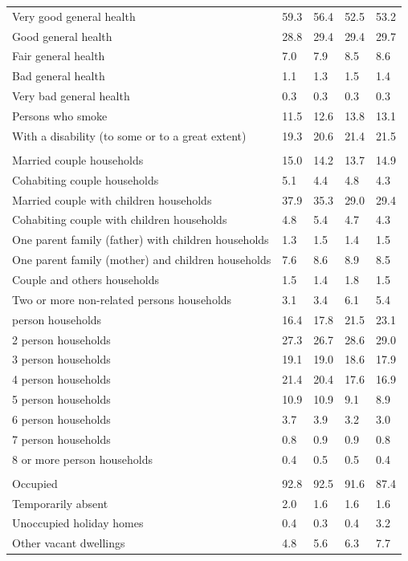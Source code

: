 \documentclass{article}
\begin{document}
\begin{table}[h]
\begin{tabular}{KTTTT}
    \hline
Very good general health & 59.3& 56.4&52.5& 53.2\\
Good general health & 28.8& 29.4& 29.4& 29.7\\
Fair general health & 7.0& 7.9&8.5& 8.6\\
Bad general health & 1.1& 1.3&1.5& 1.4\\
Very bad general health & 0.3& 0.3&0.3& 0.3\\
    \hline
Persons who smoke & 11.5& 12.6&13.8& 13.1\\
    \hline
With a disability (to some or to a great extent) & 19.3& 20.6&21.4& 21.5\\
\hline
    \\ 
    \hline
Married couple households & 15.0& 14.2& 13.7& 14.9\\
Cohabiting couple households & 5.1& 4.4& 4.8& 4.3\\
Married couple with children households & 37.9& 35.3& 29.0& 29.4\\
Cohabiting couple with children households & 4.8& 5.4& 4.7& 4.3\\
One parent family (father) with  children households & 1.3& 1.5& 1.4& 1.5\\
One parent family (mother) and children households & 7.6& 8.6& 8.9& 8.5\\
Couple and others households  & 1.5& 1.4& 1.8& 1.5\\
Two or more non-related persons households & 3.1& 3.4& 6.1& 5.4\\
     person households & 16.4& 17.8& 21.5& 23.1\\
2 person households & 27.3& 26.7& 28.6& 29.0\\
3 person households & 19.1& 19.0& 18.6& 17.9\\
4 person households & 21.4& 20.4& 17.6& 16.9\\
5 person households & 10.9& 10.9&  9.1&  8.9\\
6 person households & 3.7& 3.9& 3.2& 3.0\\
7 person households & 0.8& 0.9& 0.9& 0.8\\
8 or more person households & 0.4& 0.5& 0.5& 0.4\\
\hline
    \\ 
    \hline
Occupied & 92.8& 92.5& 91.6& 87.4\\
Temporarily absent & 2.0& 1.6& 1.6& 1.6\\
Unoccupied holiday homes & 0.4& 0.3& 0.4& 3.2\\
Other vacant dwellings & 4.8& 5.6& 6.3& 7.7\\
\hline
\end{tabular}
\end{table}
\end{document}
